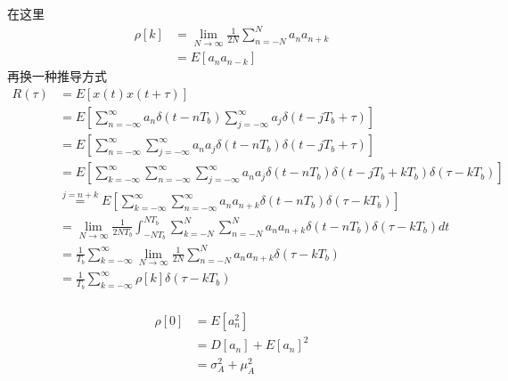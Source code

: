 \documentclass[
]{article}
\begin{document}
在这里
\begin{equation}
\begin{aligned}
\rho[k] &= \lim\limits_{N \to \infty} \frac{1}{2N} \sum\limits_{n=-N}^{N} a_n a_{n+k}\\
&= E[a_n a_{n-k}]
\end{aligned}
\end{equation}
再换一种推导方式
\begin{equation}
\begin{aligned}
R(\tau) &= E[x(t)x(t+\tau)]\\
&= E[\sum\limits_{n=-\infty}^{\infty} a_n \delta(t-nT_b) \sum\limits_{j=-\infty}^{\infty} a_j \delta(t-jT_b+\tau) ] \\
&= E[\sum\limits_{n=-\infty}^{\infty} \sum\limits_{j=-\infty}^{\infty} a_n a_j \delta(t-nT_b) \delta(t-jT_b+\tau) ] \\
&= E[\sum\limits_{k=-\infty}^{\infty} \sum\limits_{n=-\infty}^{\infty} \sum\limits_{j=-\infty}^{\infty} a_n a_j \delta(t-nT_b) \delta(t-jT_b+kT_b) \delta(\tau-kT_b)] \\
&\overset{j=n+k}= E[\sum\limits_{k=-\infty}^{\infty} \sum\limits_{n=-\infty}^{\infty} a_n a_{n+k} \delta(t-nT_b) \delta(\tau-kT_b)] \\
&= \lim\limits_{N \to \infty} \frac{1}{2NT_b} \int_{-NT_b}^{NT_b} \sum\limits_{k=-N}^{N} \sum\limits_{n=-N}^{N} a_n a_{n+k} \delta(t-nT_b) \delta(\tau-kT_b) dt \\
&= \frac{1}{T_b} \sum\limits_{k=-\infty}^{\infty} \lim\limits_{N \to \infty} \frac{1}{2N} \sum\limits_{n=-N}^{N} a_n a_{n+k} \delta(\tau-kT_b)\\
&= \frac{1}{T_b} \sum\limits_{k=-\infty}^{\infty} \rho[k] \delta(\tau-kT_b)\\
\end{aligned}
\end{equation}

\begin{equation}
\begin{aligned}
\rho[0] &= E[a_n^2]\\
&= D[a_n] + E[a_n]^2\\
&= \sigma_A^2 + \mu_A^2\\
\end{aligned}
\end{equation}
\end{document}
